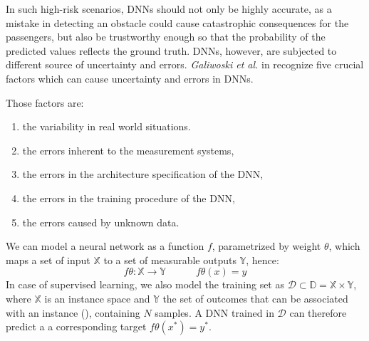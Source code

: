 In such high-risk scenarios, DNNs should not only be highly accurate, as a mistake in detecting an obstacle could cause catastrophic consequences for the passengers, but also be trustworthy enough so that the probability of the predicted values reflects the ground truth. DNNs, however, are subjected to different source of uncertainty and errors. \textit{Galiwoski et al.} in \cite{gawlikowski2021survey} recognize five crucial factors which can cause uncertainty and errors in DNNs.\\\hfill

Those factors are:

\begin{enumerate}[label=\Roman*.]
    \item the variability in real world situations. 
    \item the errors inherent to the measurement systems,
    \item the errors in the architecture specification of the DNN,
    \item the errors in the training procedure of the DNN,
    \item the errors caused by unknown data.
\end{enumerate}
We can model a neural network as a function $f$, parametrized by weight $\theta$, which maps a set of input $\mathbb{X}$ to a set of measurable outputs $\mathbb{Y}$, hence:
\begin{equation}
    f\theta : \mathbb{X} \rightarrow \mathbb{Y} \quad\quad\quad
    f\theta(x) = y
    \label{eq:DNN_model}
\end{equation}
In case of supervised learning, we also model the training set as $\mathcal{D} \subset \mathbb{D} = \mathbb{X} \times \mathbb{Y}$, where $\mathbb{X}$ is an instance space and $\mathbb{Y}$ the set of outcomes that can be associated with an instance (\cite{uncertainity_classi}), containing $N$ samples. A DNN trained in $\mathcal{D}$ can therefore predict a a corresponding target $f\theta(x^*) = y^*$.\\
